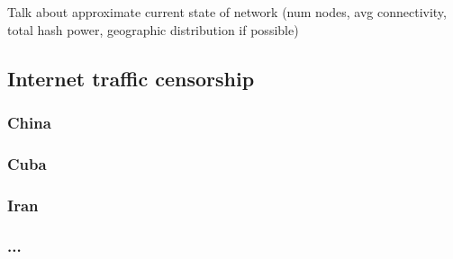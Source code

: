 Talk about approximate current state of network (num nodes, avg connectivity, total hash power, geographic distribution if possible)

\subsection{Internet traffic censorship}
\subsubsection{China}
\subsubsection{Cuba}
\subsubsection{Iran}
\subsubsection{...}
